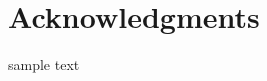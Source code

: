 \documentclass[book.tex]{subfiles}
\begin{document}
\chapter{Acknowledgments}
sample text
\end{document}
